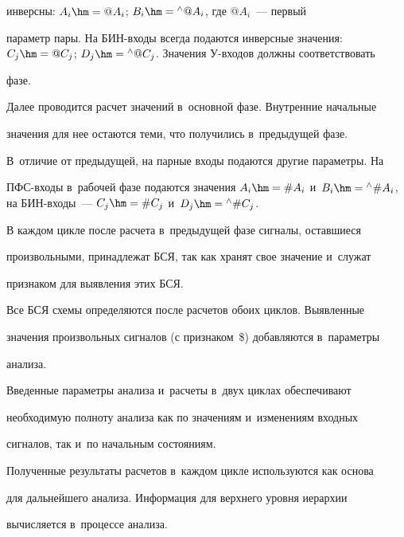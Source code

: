 инверсны: $A_i\hm = @A_i$; $B_i \hm= {}^{\wedge}@A_i$, где $@A_i$~--- первый 


параметр пары. На БИН-входы всегда подаются инверсные значения: $C_j\hm = 


@C_j$; $D_j\hm = {}^{\wedge}@C_j$. Значения У-вхо\-дов должны соответствовать 


фазе.


   


   Далее проводится расчет значений в~основной фазе. Внутренние начальные 


значения для нее остаются теми, что получились в~предыдущей фазе. 


В~отличие от предыдущей, на парные входы подаются другие параметры. На 


ПФС-вхо\-ды в~рабочей фазе подаются значения $A_i \hm= \#A_i$ и~$B_i \hm= 


{}^{\wedge}\#A_i$, на БИН-вхо\-ды~--- $C_j \hm= \#C_j$ и~$D_j \hm= {}^{\wedge}\#C_j$.


   


   В каждом цикле после расчета в~предыдущей фазе сигналы, оставшиеся 


произвольными, принадлежат БСЯ, так как хранят свое значение и~служат 


признаком для выявления этих БСЯ.


   


   Все БСЯ схемы определяются после расчетов обоих циклов. Выявленные 


значения произвольных сигналов (с признаком~\$) добавляются в~параметры 


анализа.


   


   Введенные параметры анализа и~расчеты в~двух циклах обеспечивают 


необходимую полноту анализа как по значениям и~изменениям входных 


сигналов, так и~по начальным состояниям.


   


   Полученные результаты расчетов в~каждом цикле используются как основа 


для дальнейшего анализа. Информация для верхнего уровня иерархии 


вычисляется в~процессе анализа.





